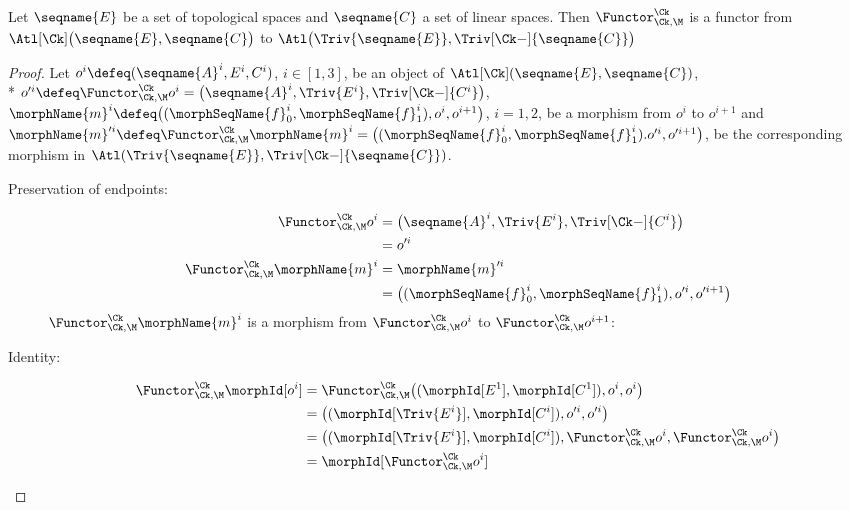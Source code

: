 \documentclass{article}
\begin{document}
\begin{theorem}
\label{the:Func-Ck-M}
Let $\seqname{E}$ be a set of topological spaces and $\seqname{C}$ a
set of linear spaces. Then
$\Functor^\Ck_{\Ck,\M}$ is a functor from
$\Atl[\Ck] \bigl ( \seqname{E}, \seqname{C} \bigr )$
to
$\Atl \bigl ( \Triv{\seqname{E}}, \Triv[\Ck-]{\seqname{C}} \bigr )$

\begin{proof}
Let $o^i \defeq (\seqname{A}^i, E^i, C^i)$,
$i \in [1,3]$, be an object of $\Atl[\Ck](\seqname{E}, \seqname{C})$, \\*
$
  o'^i \defeq
  \Functor^\Ck_{\Ck,\M} o^i
  =
  \bigl (
     \seqname{A}^i,
     \Triv{E^i},
     \Triv[\Ck-]{C^i}
   \bigr )
$,
$
  \morphName{m}^i \defeq
    \bigl (
      (\morphSeqName{f}^i_0, \morphSeqName{f}^i_1),
      o^i,
      o^{i+1}
    \bigr )
$, $i=1,2$,
be a morphism from $o^i$ to $o^{i+1}$ and
$
  \morphName{m}'^i \defeq
  \Functor^\Ck_{\Ck,\M} \morphName{m}^i
  =
    \bigl (
      (\morphSeqName{f}^i_0, \morphSeqName{f}^i_1).
      o'^i,
      o'^{i+1}
    \bigr )
$,
be the corresponding morphism in
$\Atl(\Triv{\seqname{E}}, \Triv[\Ck-]{\seqname{C}})$.

\begin{description}
\item[Preservation of endpoints:]
\begin{align*}
  \Functor^\Ck_{\Ck,\M} o^i
  & =
  \bigl (
     \seqname{A}^i,
     \Triv{E^i},
     \Triv[\Ck-]{C^i}
   \bigr )
\\*
  & =
  o'^i
\\*
  \Functor^\Ck_{\Ck,\M} \morphName{m}^i
  & =
  \morphName{m}'^i
\\*
  & =
    \bigl (
      (
        \morphSeqName{f}^i_0,
        \morphSeqName{f}^i_1
      ),
     o'^i,
     o'^{i+1}
    \bigr )
\end{align*}
$\Functor^\Ck_{\Ck,\M} \morphName{m}^i$ is a morphism from
$\Functor^\Ck_{\Ck,\M} o^i$ to $\Functor^\Ck_{\Ck,\M} o^{i+1}$:

\item[Identity:]
\begin{align*}
  \Functor^\Ck_{\Ck,\M} \morphId[{o^i}]
  & =
  \Functor^\Ck_{\Ck,\M}
    \bigl (
      (\morphId[{E^1}], \morphId[{C^1}]),
      o^i,
      o^i
    \bigr )
\\*
  & =
  \bigl (
    (\morphId[{\Triv{E^i}}], \morphId[{C^i}]),
    o'^i,
    o'^i
  \bigr )
\\*
  & =
  \bigl (
    (\morphId[{\Triv{E^i}}], \morphId[{C^i}]),
    \Functor^\Ck_{\Ck,\M} o^i,
    \Functor^\Ck_{\Ck,\M} o^i
  \bigr )
\\*
  & =
  \morphId[{\Functor^\Ck_{\Ck,\M} o^i}]
\end{align*}


\end{description}
\end{proof}
\end{theorem}
\end{document}

